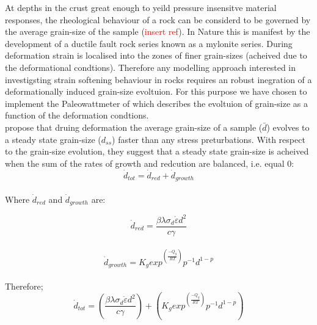 \documentclass[]{scrreprt}
\begin{document}
At depths in the crust great enough to yeild pressure insensitve material responses, the rheological behaviour of a rock can be considerd to be governed by the average grain-size of the sample (\textcolor{red}{insert ref}). In Nature this is manifest by the development of a ductile fault rock series known as a mylonite series. During deformation strain is localised into the zones of finer grain-sizes (acheived due to the deformational condtions). Therefore any modelling approach interested in investigsting strain softening behaviour in rocks requires an robust inegration of a deformationally induced grain-size evoltuion. For this purpose we have chosen to implement the Paleowattmeter of \citep{Austin2007} which describes the evoltuion of grain-size as a function of the deformation condtions.\\  

\citet{Austin2007} propose that druing deformation the average grain-size of a sample ($\bar{d}$) evolves to a steady state grain-size ($d_{ss}$) faster than any stress preturbations. With respect to the grain-size evolution, they suggest that a steady state grain-size is acheived when the sum of the rates of growth and redcution are balanced, i.e. equal 0:\\

\begin{equation}
 \label{eq:rate_change_dss}
\dot{d}_{tot} = \dot{d}_{red} + \dot{d}_{growth}
\end{equation}\\

Where $\dot{d}_{red}$ and $\dot{d}_{growth}$ are:

\begin{equation}
 \label{eq:d_red}
\dot{d}_{red}=\frac{\beta\lambda\sigma_{d}\dot{\varepsilon}d^2}{c\gamma}
\end{equation}\\

\begin{equation}
 \label{eq:d_growth}
\dot{d}_{growth}=K_g exp^{\left(\frac{-Q_g}{RT}\right)} p^{-1} d^{1-p} 	
\end{equation}\\

Therefore; \:
\begin{equation}
 \label{eq:d_tot}
\dot{d}_{tot} = \left(\frac{\beta\lambda\sigma_{d}\dot{\varepsilon}d^2}{c\gamma}\right) + \left(K_g exp^{\left(\frac{-Q_g}{RT}\right)} p^{-1} d^{1-p}\right)
\end{equation}\\
\end{document}
